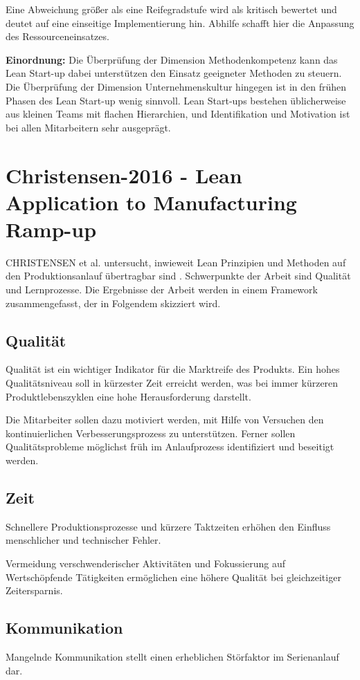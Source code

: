 Eine Abweichung größer als eine Reifegradstufe wird als kritisch bewertet und deutet auf eine einseitige Implementierung hin. Abhilfe schafft hier die Anpassung des Ressourceneinsatzes. 

\textbf{Einordnung:} 
Die Überprüfung der Dimension Methodenkompetenz kann das Lean Start-up dabei unterstützen den Einsatz geeigneter Methoden zu steuern. 
Die Überprüfung der Dimension Unternehmenskultur hingegen ist in den frühen Phasen des Lean Start-up wenig sinnvoll. Lean Start-ups bestehen üblicherweise aus kleinen Teams mit flachen Hierarchien, und Identifikation und Motivation ist bei allen Mitarbeitern sehr ausgeprägt.


\section{Christensen-2016 - Lean Application to Manufacturing Ramp-up}

CHRISTENSEN et al. untersucht, inwieweit Lean Prinzipien und Methoden auf den Produktionsanlauf übertragbar sind \cite{Christensen2016}. Schwerpunkte der Arbeit sind Qualität und Lernprozesse. Die Ergebnisse der Arbeit werden in einem Framework zusammengefasst, der in Folgendem skizziert wird. 

\subsection{Qualität}
Qualität ist ein wichtiger Indikator für die Marktreife des Produkts. Ein hohes Qualitätsniveau soll in kürzester Zeit erreicht werden, was bei immer kürzeren Produktlebenszyklen eine hohe Herausforderung darstellt. 

Die Mitarbeiter sollen dazu motiviert werden, mit Hilfe von Versuchen den kontinuierlichen Verbesserungsprozess zu unterstützen. Ferner sollen Qualitätsprobleme möglichst früh im Anlaufprozess identifiziert und beseitigt werden. 

\subsection{Zeit}
Schnellere Produktionsprozesse und kürzere Taktzeiten erhöhen den Einfluss menschlicher und technischer Fehler. 

Vermeidung verschwenderischer Aktivitäten und Fokussierung auf Wertschöpfende Tätigkeiten ermöglichen eine höhere Qualität bei gleichzeitiger Zeitersparnis. 

\subsection{Kommunikation}
Mangelnde Kommunikation stellt einen erheblichen Störfaktor im Serienanlauf dar. 

